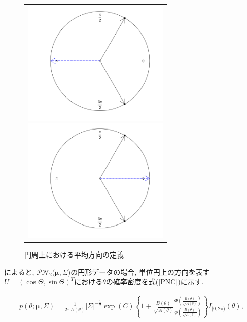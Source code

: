 \documentclass[a4j,12pt]{jarticle}
\begin{document}
\begin{figure}[bp]
 \begin{tabular}{c}
 \begin{minipage}{0.5\hsize}
  \begin{center}
   \includegraphics[clip,height= 60mm]{data/sample_False.png}
\caption{算術平均による平均の定義}
\label{sample_mu1}
  \end{center}
 \end{minipage}
 \begin{minipage}{0.5\hsize}
  \begin{center}
 \includegraphics[clip,height= 60mm]{data/sample_True.png}
\caption{円周上における平均方向の定義}
\label{sample_mu2}
  \end{center}
 \end{minipage}
\end{tabular}
\label{sample_mu}
\end{figure}

\newpage
\citet{PN1}によると, $\mathcal{PN}_2(\bm \mu,\Sigma$)の円形データの場合, 単位円上の方向を表す$U = (\cos\Theta, \sin\Theta)^T$における$\theta$の確率密度を式(\ref{PNC})に示す.

\begin{eqnarray}
\label{PNC}
p(\theta; \bm \mu, \Sigma) = \frac{1}{2\pi A(\theta)}|\Sigma|^{-\frac{1}{2}}
\exp(C)\left\{1 + \frac{B(\theta)}{\sqrt{A(\theta)}} \frac{\Phi \left(\frac{B(\theta)}{\sqrt{A(\theta)}}\right)}{\phi \left(\frac{B(\theta)}{\sqrt{A(\theta)}}\right)}\right\} I_{[0,2\pi)}(\theta),
\end{eqnarray}
\end{document}

